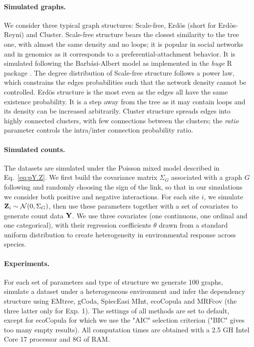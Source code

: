 \paragraph{Simulated graphs.}
We consider three typical graph structures: Scale-free, Erdös (short for Erdös-Reyni) and Cluster.
Scale-free structure bears the closest similarity to the tree one, with almost the same density and no loops; it is popular in social networks and in genomics as it corresponds to a preferential-attachment behavior. 
It is simulated following the Barb\'{a}si-Albert model as implemented in the \textit{huge} R package \citep{huge}. The degree distribution of Scale-free structure follows a power law, which constrains the edges probabilities such that the network density cannot be controlled.
Erdös structure is the most even as the edges all have the same existence probability. It is a step away from the tree as it may contain loops and its density can be increased arbitrarily.
Cluster structure spreads edges into highly connected clusters, with few connections between the clusters; the \textit{ratio} parameter controls the intra/inter connection probability ratio.




\paragraph{Simulated counts.}
The datasets are simulated under the Poisson mixed model described in Eq.~\eqref{eq:pY.Z}. We first build the covariance matrix $\Sigma_G$ associated with a graph $G$ following \citet{huge} and randomly choosing the sign of the link, so that in our simulations we consider both positive and negative interactions. For each site $i$, we simulate ${\bf Z}_i \sim \mathcal{N}(0,\Sigma_G)$, then use these parameters together with a set of covariates to generate count data ${\bf Y}$. We use three covariates (one continuous, one ordinal and one categorical), with their regression coefficients $\theta$ drawn from a standard uniform distribution to create heterogeneity in environmental response across species.

\paragraph{Experiments.}
For each set of parameters and type of structure we generate 100 graphs, simulate a dataset under a heterogeneous environment and infer the dependency structure using EMtree, gCoda, SpiecEasi MInt, ecoCopula and MRFcov (the three latter only for Exp. 1). 
The settings of all methods are set to default, except for ecoCopula for which we use the "AIC" selection criterion ("BIC" gives too many empty results).
All computation times are obtained with a 2.5 GH Intel Core 17 processor and 8G of RAM.

